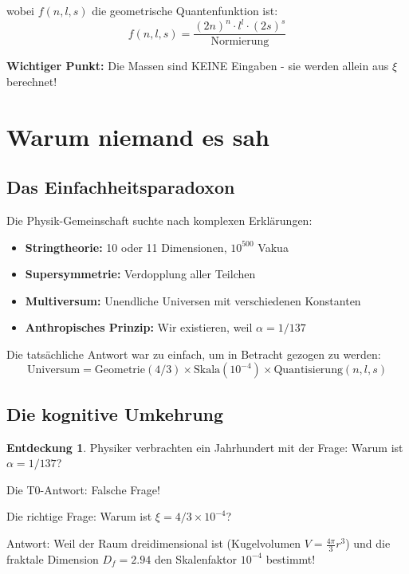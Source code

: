 \documentclass[12pt,a4paper]{article}
\theoremstyle{definition}
\newtheorem{entdeckung}{Entdeckung}[section]
\begin{document}
	wobei $f(n,l,s)$ die geometrische Quantenfunktion ist:
	\begin{equation}
		f(n,l,s) = \frac{(2n)^n \cdot l^l \cdot (2s)^s}{\text{Normierung}}
	\end{equation}
	
	\textbf{Wichtiger Punkt:} Die Massen sind KEINE Eingaben - sie werden allein aus $\xi$ berechnet!
	
	\section{Warum niemand es sah}
	
	\subsection{Das Einfachheitsparadoxon}
	
	Die Physik-Gemeinschaft suchte nach komplexen Erklärungen:
	
	\begin{itemize}
		\item \textbf{Stringtheorie:} 10 oder 11 Dimensionen, $10^{500}$ Vakua
		\item \textbf{Supersymmetrie:} Verdopplung aller Teilchen
		\item \textbf{Multiversum:} Unendliche Universen mit verschiedenen Konstanten
		\item \textbf{Anthropisches Prinzip:} Wir existieren, weil $\alpha = 1/137$
	\end{itemize}
	
	Die tatsächliche Antwort war zu einfach, um in Betracht gezogen zu werden:
	\begin{equation}
		\boxed{\text{Universum} = \text{Geometrie}(4/3) \times \text{Skala}(10^{-4}) \times \text{Quantisierung}(n,l,s)}
	\end{equation}
	
	\subsection{Die kognitive Umkehrung}
	
	\begin{entdeckung}
		Physiker verbrachten ein Jahrhundert mit der Frage: Warum ist $\alpha = 1/137$?
		
		Die T0-Antwort: Falsche Frage!
		
		Die richtige Frage: Warum ist $\xi = 4/3 \times 10^{-4}$?
		
		Antwort: Weil der Raum dreidimensional ist (Kugelvolumen $V = \frac{4\pi}{3} r^3$) und die fraktale Dimension $D_f = 2.94$ den Skalenfaktor $10^{-4}$ bestimmt!
	\end{entdeckung}
	
\end{document}
